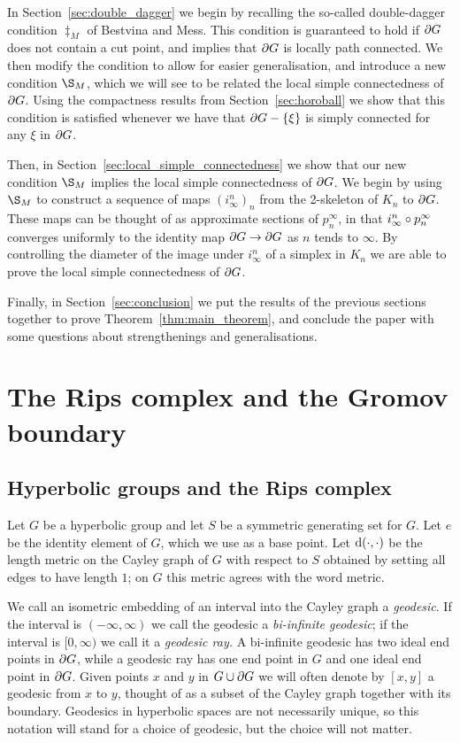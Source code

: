 \documentclass[a4paper]{article}
\begin{document}
In Section~\ref{sec:double_dagger} we begin by recalling the so-called
double-dagger condition $\ddag_M$ of Bestvina and Mess. This condition is
guaranteed to hold if $\partial G$ does not contain a cut point, and implies
that $\partial G$ is locally path connected. We then modify the condition to
allow for easier generalisation, and introduce a new condition $\S_M$, which we
will see to be related the local simple connectedness of $\partial G$. Using
the compactness results from Section~\ref{sec:horoball} we show that this
condition is satisfied whenever we have that $\partial G - \left\{\xi\right\}$ is simply
connected for any $\xi$ in $\partial G$.

Then, in Section~\ref{sec:local_simple_connectedness} we show that our new
condition $\S_M$ implies the local simple connectedness of $\partial G$. We
begin by using $\S_M$ to construct a sequence of maps $(i^n_\infty)_n$ from the
2-skeleton of $K_n$ to $\partial G$. These maps can be thought of as
approximate sections of $p^\infty_n$, in that $i^n_\infty\circ p^\infty_n$
converges uniformly to the identity map $\partial G \to \partial G$ as $n$
tends to $\infty$. By controlling the diameter of the image under $i^n_\infty$
of a simplex in $K_n$ we are able to prove the local simple connectedness of
$\partial G$.

Finally, in Section~\ref{sec:conclusion} we put the results of the previous
sections together to prove Theorem~\ref{thm:main_theorem}, and conclude the
paper with some questions about strengthenings and generalisations.

\section{The Rips complex and the Gromov boundary}\label{sec:spheres}

\subsection{Hyperbolic groups and the Rips complex}

Let $G$ be a hyperbolic group and let $S$ be a symmetric generating set for
$G$. Let $e$ be the identity element of $G$, which we use as a base point. Let
$\operatorname{d}(\cdot, \cdot)$ be the length metric on the Cayley graph of $G$ with
respect to $S$ obtained by setting all edges to have length $1$; on $G$ this
metric agrees with the word metric. 

We call an isometric embedding of an interval into the Cayley graph a
\emph{geodesic}. If the interval is $(-\infty, \infty)$ we call the geodesic a
\emph{bi-infinite geodesic}; if the interval is $[0, \infty)$ we call it a
\emph{geodesic ray.} A bi-infinite geodesic has two ideal end points in
$\partial G$, while a geodesic ray has one end point in $G$ and one ideal end
point in $\partial G$.  Given points $x$ and $y$ in $G \cup \partial G$ we
will often denote by $[x,y]$ a geodesic from $x$ to $y$, thought of as a subset
of the Cayley graph together with its boundary. Geodesics in hyperbolic spaces
are not necessarily unique, so this notation will stand for a choice of
geodesic, but the choice will not matter.
\end{document}
